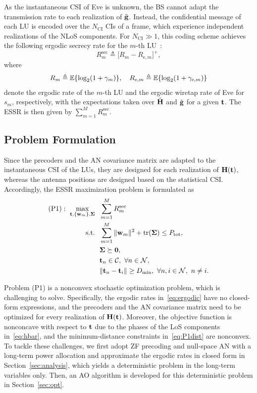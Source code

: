 \documentclass[journal]{IEEEtran}
\begin{document}
As the instantaneous CSI of Eve is unknown, the BS cannot adapt the transmission rate to each realization of $\tilde{\mathbf{g}}$. Instead, the confidential message of each LU is encoded over the $N_{\mathrm{CI}}$ CIs of a frame, which experience independent realizations of the NLoS components. For $N_{\mathrm{CI}}\gg1$, this coding scheme achieves the following ergodic secrecy rate for the $m$-th LU~\cite{Gopala2008,ZhuTWC2014}:
\begin{equation}\label{eq:esr}
R_m^{\mathrm{sec}}\triangleq\big[R_m-R_{\mathrm{e},m}\big]^+,
\end{equation}
where
\begin{equation}\label{eq:ergodic}
R_m\triangleq\mathbb{E}\{\log_2(1+\gamma_m)\},\quad R_{\mathrm{e},m}\triangleq\mathbb{E}\{\log_2(1+\gamma_{\mathrm{e},m})\}
\end{equation}
denote the ergodic rate of the $m$-th LU and the ergodic wiretap rate of Eve for $s_m$, respectively, with the expectations taken over $\tilde{\mathbf{H}}$ and $\tilde{\mathbf{g}}$ for a given $\mathbf{t}$. The ESSR is then given by $\sum_{m=1}^MR_m^{\mathrm{sec}}$.

\subsection{Problem Formulation}

Since the precoders and the AN covariance matrix are adapted to the instantaneous CSI of the LUs, they are designed for each realization of $\mathbf{H}(\mathbf{t})$, whereas the antenna positions are designed based on the statistical CSI. Accordingly, the ESSR maximization problem is formulated as
\begin{subequations}\label{eq:P1}
\begin{align}
(\mathrm{P1}):\ \max_{\mathbf{t},\{\mathbf{w}_m\},\boldsymbol{\Sigma}}\ \ & \sum_{m=1}^{M}R_m^{\mathrm{sec}}\label{eq:P1obj}\\
\mathrm{s.t.}\ \ & \sum_{m=1}^M\|\mathbf{w}_m\|^2+\mathrm{tr}(\boldsymbol{\Sigma})\le P_{\mathrm{tot}},\nonumber\\
& \boldsymbol{\Sigma}\succeq\mathbf 0,\label{eq:P1pow}\\
& \mathbf{t}_n\in\mathcal C,\ \forall n\in\mathcal N,\label{eq:P1region}\\
& \|\mathbf{t}_n-\mathbf{t}_i\|\ge D_{\min},\ \forall n,i\in\mathcal N,\ n\neq i.\label{eq:P1dist}
\end{align}
\end{subequations}

Problem (P1) is a nonconvex stochastic optimization problem, which is challenging to solve. Specifically, the ergodic rates in~\eqref{eq:ergodic} have no closed-form expressions, and the precoders and the AN covariance matrix need to be optimized for every realization of $\mathbf{H}(\mathbf{t})$. Moreover, the objective function is nonconcave with respect to $\mathbf{t}$ due to the phases of the LoS components in~\eqref{eq:hbar}, and the minimum-distance constraints in~\eqref{eq:P1dist} are nonconvex. To tackle these challenges, we first adopt ZF precoding and null-space AN with a long-term power allocation and approximate the ergodic rates in closed form in Section~\ref{sec:analysis}, which yields a deterministic problem in the long-term variables only. Then, an AO algorithm is developed for this deterministic problem in Section~\ref{sec:opt}.
\end{document}

